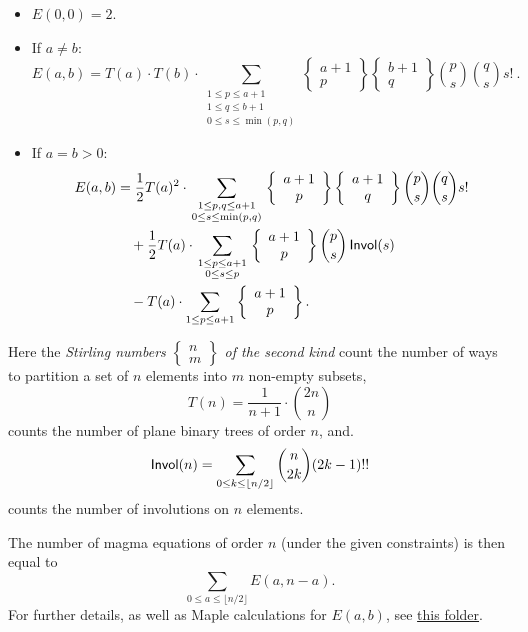 \begin{itemize}
\item $E(0,0) = 2$.
\item  If $a\neq b$:
$$
E(a,b) = T(a) \cdot T(b) \cdot
\sum_{\begin{smallmatrix} 1 \le p \le a+1 \\ 1 \le q \le b+1 \\ 0 \le s \le \min(p,q) \end{smallmatrix}}
\left\{\begin{array}{c} a+1 \\ p \end{array}\right\}
\left\{\begin{array}{c} b+1 \\ q \end{array}\right\}
\binom{p}{s} \binom{q}{s} s! \ .
$$
\item If $a= b > 0$:
\begin{align*}
  E(a,b) &= \frac{1}{2} T(a)^2 \cdot \sum_{\begin{smallmatrix}1 \le p,q \le a+1\\ 0 \le s \le \min(p,q)\end{smallmatrix}}
  \left\{\begin{array}{c} a+1 \\ p \end{array}\right\}
  \left\{\begin{array}{c} a+1 \\ q \end{array}\right\}
  \binom{p}{s} \binom{q}{s} s! \\
  &\quad + \frac{1}{2} T(a) \cdot \sum_{\begin{smallmatrix}1 \le p \le a+1\\ 0 \le s \le p\end{smallmatrix}}
  \left\{\begin{array}{c} a+1 \\ p \end{array}\right\}
  \binom{p}{s} \, {\sf Invol}(s) \\
  &\quad - T(a) \cdot \sum_{1 \le p \le a+1}
  \left\{\begin{array}{c} a+1 \\ p \end{array}\right\}.
\end{align*}
\end{itemize}

Here the {\it Stirling numbers $\left\{\substack{n\\m}\right\}$ of the second kind} count the number of ways to partition a set of $n$ elements into $m$ non-empty subsets,
$$
T(n) = \frac{1}{n+1} \cdot \binom{2n}{n}
$$
counts the number of plane binary trees of order $n$, and.
$$
{\sf Invol}(n) = \sum_{0 \leq k \leq \lfloor n/2 \rfloor}  \binom{n}{2k} (2k-1)!!
$$
counts the number of involutions on $n$ elements.

The number of magma equations of order $n$ (under the given constraints) is then equal to
$$\sum_{0 \le a \le \lfloor n/2 \rfloor } E(a,n-a) .
$$
For further details, as well as Maple calculations for $E(a,b)$, see \href{https://github.com/teorth/equational_theories/tree/main/scripts/count_magma_eqns}{this folder}.
